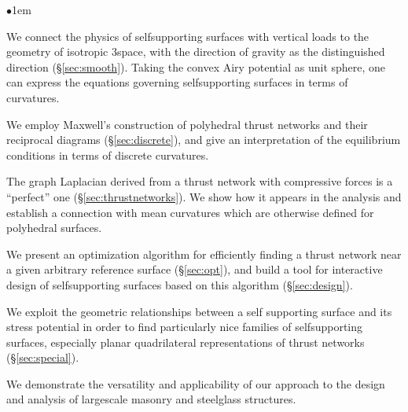 \documentclass[review]{acmsiggraph}
\newcommand{\secref}[1]{(\S\ref{#1})}
\begin{document}
\begin{list}{$\bullet$}{\itemindent1em}

\item We connect the physics of self\dash supporting surfaces with 
vertical loads to the geometry of isotropic 3\dash space, with the 
direction of gravity as the distinguished direction \secref{sec:smooth}. 
Taking the convex Airy potential as unit sphere, one can express the 
equations governing self\dash supporting surfaces in terms of curvatures.


\item We employ Maxwell's construction of polyhedral thrust networks and 
their reciprocal diagrams \secref{sec:discrete}, and give an 
interpretation of the equilibrium conditions in terms of discrete 
curvatures.

\item The graph Laplacian derived from a thrust network with compressive 
forces is a ``perfect'' one \secref{sec:thrustnetworks}.
We show how it appears in the analysis and 
establish a connection with mean curvatures which are otherwise defined 
for polyhedral surfaces.


\item We present an optimization algorithm for efficiently finding a 
thrust network near a given arbitrary reference surface \secref{sec:opt}, 
and build a tool for interactive design of self\dash supporting surfaces 
based on this algorithm \secref{sec:design}.

\item We exploit the geometric relationships between a self\dash 
supporting surface and its stress potential in order to find particularly 
nice families of self\dash supporting surfaces, especially planar 
quadrilateral representations of thrust networks \secref{sec:special}.

\item We demonstrate the versatility and applicability of our approach to 
the design and analysis of large\dash scale masonry and steel\dash glass 
structures.

\end{list}
\end{document}
